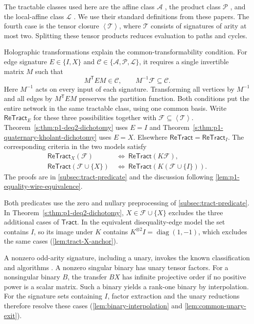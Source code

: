 \documentclass[11pt,letterpaper,onecolumn]{article}
\theoremstyle{plain}
\theoremstyle{definition}
\theoremstyle{remark}
\newcommand{\cF}{\mathcal F}
\newcommand{\cA}{\mathscr A}
\newcommand{\cP}{\mathscr P}
\newcommand{\cL}{\mathscr L}
\newcommand{\cT}{\mathscr T}
\newcommand{\cC}{\mathscr C}
\newcommand{\angles}[1]{\left\langle #1\right\rangle}
\newcommand{\Tract}{\mathsf{Tract}}
\newcommand{\ReTract}{\mathsf{ReTract}}
\newcommand{\diag}{\operatorname{diag}}
\begin{document}
The tractable classes used here are the affine class \(\cA\)
\cite{CaiLuXia2009,CaiLuXia2014}, the product class \(\cP\)
\cite{DyerGoldbergJerrum2009,CaiLuXia2014}, and the local-affine class
\(\cL\) \cite{CaiLuXia2018RealHolantc}. We use their standard
definitions from these papers. The fourth case is the tensor closure
\(\angles{\cT}\), where \(\cT\) consists of signatures of arity at most
two. Splitting these tensor products reduces evaluation to paths and cycles.

Holographic transformations explain the common-transformability
condition. For edge signature \(E\in\{I,X\}\) and
\(\cC\in\{\cA,\cP,\cL\}\), it requires a single invertible matrix \(M\)
such that
\[
 M^{\mathsf T}EM\in\cC,\qquad M^{-1}\cF\subseteq\cC.
\]
Here \(M^{-1}\) acts on every input of each signature. Transforming all
vertices by \(M^{-1}\) and all edges by \(M^{\mathsf T}EM\) preserves
the partition function. Both conditions put the entire network in the
same tractable class, using one common basis.
Write \(\ReTract_E\) for these three possibilities together with
\(\cF\subseteq\angles{\cT}\). Theorem~\ref{s:thm:p1-deq2-dichotomy}
uses \(E=I\) and Theorem~\ref{s:thm:p1-quaternary-kholant-dichotomy}
uses \(E=X\). Elsewhere \(\ReTract=\ReTract_I\).
The corresponding criteria in the two models satisfy
\[
\begin{aligned}
 \ReTract_X(\cF)&\ \Longleftrightarrow\ \ReTract(K\cF),\\
 \ReTract(\cF\cup\{X\})&\ \Longleftrightarrow\ \ReTract(K(\cF\cup\{I\})).
\end{aligned}
\]
The proofs are in \cref{subsec:tract-predicate} and
the discussion following \cref{lem:p1-equality-wire-equivalence}.

Both predicates use the zero and nullary preprocessing of \cref{subsec:tract-predicate}. In Theorem~\ref{s:thm:p1-deq2-dichotomy},
\(X\in\cF\cup\{X\}\) excludes the three additional cases of \(\Tract\).
In the equivalent disequality-edge model the set contains \(I\), so its
image under \(K\) contains \(K^{\otimes2}I=\diag(1,-1)\), which excludes
the same cases (\cref{lem:tract-X-anchor}).

A nonzero odd-arity signature, including a unary, invokes the known
classification and algorithms \cite{MengWangXiaZheng2025,GuanShaoShi2026}.
A nonzero singular binary has unary tensor factors. For a nonsingular binary \(B\), the transfer \(BX\)
has infinite projective order if no positive power is a scalar matrix.
Such a binary yields a rank-one binary by interpolation. For the signature sets containing \(I\), factor
extraction and the unary reductions therefore resolve these cases
(\cref{lem:binary-interpolation} and
\cref{lem:common-unary-exit}).
\end{document}
